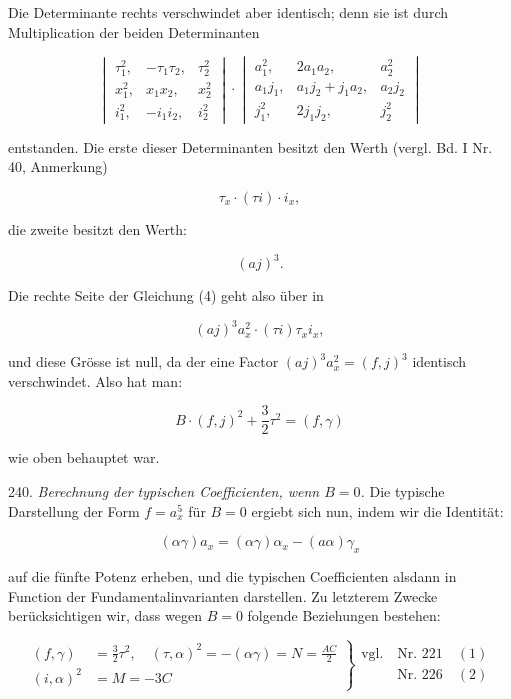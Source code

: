 Die Determinante rechts verschwindet aber identisch; denn sie
ist durch Multiplication der beiden Determinanten

\[
\begin{vmatrix} \tau_1^{2}, & -\tau_1\tau_2, & \tau_2^{2} \\ x_1^{2}, & x_1x_2, & x_2^{2} \\ i_1^{2}, & -i_1i_2, & i_2^{2} \end{vmatrix}
\cdot
\begin{vmatrix} a_1^{2}, & 2a_1a_2, & a_2^{2} \\ a_1j_1, & a_1j_2+j_1a_2, & a_2j_2 \\ j_1^{2}, & 2j_1j_2, & j_2^{2} \end{vmatrix}
\]

entstanden. Die erste dieser Determinanten besitzt den Werth (vergl.
Bd. I Nr. 40, Anmerkung)

\[ \tau_x\cdot(\tau i)\cdot i_x, \]

die zweite besitzt den Werth:

\[ (aj)^3. \]

Die rechte Seite der Gleichung (4) geht also über in

\[ (aj)^3a_x^2\cdot(\tau i)\tau_x i_x, \]

und diese Grösse ist null, da der eine Factor $(aj)^3a_x^2=(f,j)^3$ identisch
verschwindet. Also hat man:

\[ B\cdot(f,j)^2+\frac{3}{2}\tau^2=(f,\gamma) \]

wie oben behauptet war.

240. \textit{Berechnung der typischen Coefficienten, wenn $B=0$.} Die
typische Darstellung der Form $f=a_x^5$ für $B=0$ ergiebt sich nun,
indem wir die Identität:

\[ (\alpha\gamma)a_x=(\alpha\gamma)\alpha_x-(a\alpha)\gamma_x \]

auf die fünfte Potenz erheben, und die typischen Coefficienten alsdann
in Function der Fundamentalinvarianten darstellen. Zu letzterem
Zwecke berücksichtigen wir, dass wegen $B=0$ folgende Beziehungen
bestehen:

\[
\left.\begin{aligned}
(f,\gamma) &= \frac{3}{2}\tau^2, \quad (\tau,\alpha)^2 = -(\alpha\gamma) = N = \frac{AC}{2} \\
(i,\alpha)^2 &= M = -3C
\end{aligned}\right\}
\begin{array}{l} \text{vgl.} \quad \text{Nr. 221} \quad (1) \\ \phantom{\text{vgl.}} \quad \text{Nr. 226} \quad (2) \end{array}
\]


